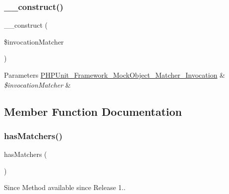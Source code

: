 \subsubsection{\texorpdfstring{\+\_\+\+\_\+construct()}{\_\_construct()}}
{\footnotesize\ttfamily \+\_\+\+\_\+construct (\begin{DoxyParamCaption}\item[{\mbox{\hyperlink{interface_p_h_p_unit___framework___mock_object___matcher___invocation}{P\+H\+P\+Unit\+\_\+\+Framework\+\_\+\+Mock\+Object\+\_\+\+Matcher\+\_\+\+Invocation}}}]{\$invocation\+Matcher }\end{DoxyParamCaption})}


\begin{DoxyParams}[1]{Parameters}
\mbox{\hyperlink{interface_p_h_p_unit___framework___mock_object___matcher___invocation}{P\+H\+P\+Unit\+\_\+\+Framework\+\_\+\+Mock\+Object\+\_\+\+Matcher\+\_\+\+Invocation}} & {\em \$invocation\+Matcher} & \\
\hline
\end{DoxyParams}


\subsection{Member Function Documentation}
\mbox{\label{class_p_h_p_unit___framework___mock_object___matcher_a81f246fc919f5043e206cc59f9bd3ed1}} 
\subsubsection{\texorpdfstring{has\+Matchers()}{hasMatchers()}}
{\footnotesize\ttfamily has\+Matchers (\begin{DoxyParamCaption}{ }\end{DoxyParamCaption})}

\begin{DoxySince}{Since}
Method available since Release 1.. 
\end{DoxySince}
\mbox{\label{class_p_h_p_unit___framework___mock_object___matcher_a63f37b06181c9547bc3c225007c34425}} 
